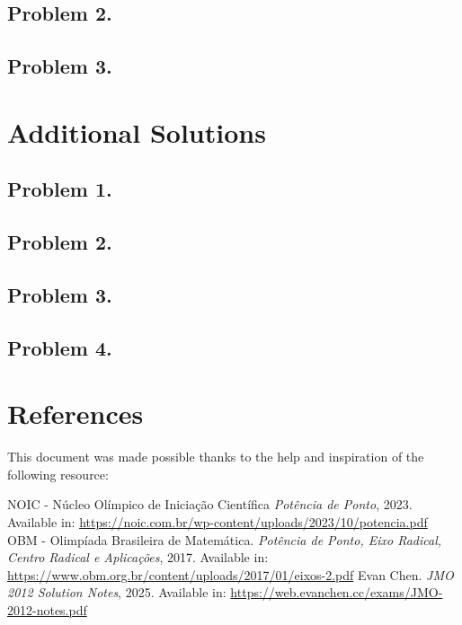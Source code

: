 \documentclass[12pt]{article}
\begin{document}
    \subsection{Problem 2.}

    \clearpage

    \subsection{Problem 3.}

  \clearpage

  \section{\textsf{Additional Solutions}}
    \subsection{Problem 1.}

    \clearpage

    \subsection{Problem 2.}

    \clearpage

    \subsection{Problem 3.}

    \clearpage

    \subsection{Problem 4.}

  \clearpage

  \section{\textsf{References}}
    This document was made possible thanks to the help and inspiration of the following resource:
    \renewcommand{\refname}{\vspace{-2em}}
    \begin{thebibliography}{9}
      NOIC - Núcleo Olímpico de Iniciação Científica
      \textit{Potência de Ponto}, 2023.
      Available in: \url{https://noic.com.br/wp-content/uploads/2023/10/potencia.pdf}
      OBM - Olimpíada Brasileira de Matemática.
      \textit{Potência de Ponto, Eixo Radical, Centro Radical e Aplicações}, 2017.
      Available in: \url{https://www.obm.org.br/content/uploads/2017/01/eixos-2.pdf}
      Evan Chen.
      \textit{JMO 2012 Solution Notes}, 2025.
      Available in: \url{https://web.evanchen.cc/exams/JMO-2012-notes.pdf}
    \end{thebibliography}
\end{document}
